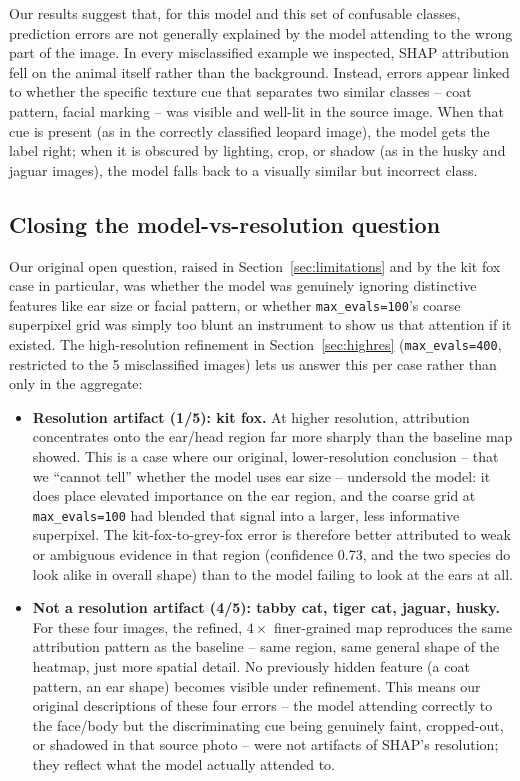Our results suggest that, for this model and this set of confusable
classes, prediction errors are not generally explained by the model
attending to the wrong part of the image. In every misclassified example we
inspected, SHAP attribution fell on the animal itself rather than the
background. Instead, errors appear linked to whether the specific texture
cue that separates two similar classes -- coat pattern, facial marking --
was visible and well-lit in the source image. When that cue is present (as
in the correctly classified leopard image), the model gets the label right;
when it is obscured by lighting, crop, or shadow (as in the husky and
jaguar images), the model falls back to a visually similar but incorrect
class.

\subsection{Closing the model-vs-resolution question}
\label{sec:discussion-highres}

Our original open question, raised in Section~\ref{sec:limitations} and by
the kit fox case in particular, was whether the model was genuinely
ignoring distinctive features like ear size or facial pattern, or whether
\texttt{max\_evals=100}'s coarse superpixel grid was simply too blunt an
instrument to show us that attention if it existed. The high-resolution
refinement in Section~\ref{sec:highres} (\texttt{max\_evals=400},
restricted to the 5 misclassified images) lets us answer this per case
rather than only in the aggregate:

\begin{itemize}
  \item \textbf{Resolution artifact (1/5): kit fox.} At higher resolution,
  attribution concentrates onto the ear/head region far more sharply than
  the baseline map showed. This is a case where our original,
  lower-resolution conclusion -- that we ``cannot tell'' whether the model
  uses ear size -- undersold the model: it does place elevated importance
  on the ear region, and the coarse grid at \texttt{max\_evals=100} had
  blended that signal into a larger, less informative superpixel. The
  kit-fox-to-grey-fox error is therefore better attributed to weak or
  ambiguous evidence in that region (confidence 0.73, and the two species
  do look alike in overall shape) than to the model failing to look at the
  ears at all.
  \item \textbf{Not a resolution artifact (4/5): tabby cat, tiger cat,
  jaguar, husky.} For these four images, the refined, $4\times$
  finer-grained map reproduces the same attribution pattern as the
  baseline -- same region, same general shape of the heatmap, just more
  spatial detail. No previously hidden feature (a coat pattern, an ear
  shape) becomes visible under refinement. This means our original
  descriptions of these four errors -- the model attending correctly to the
  face/body but the discriminating cue being genuinely faint, cropped-out,
  or shadowed in that source photo -- were not artifacts of SHAP's
  resolution; they reflect what the model actually attended to.
\end{itemize}

